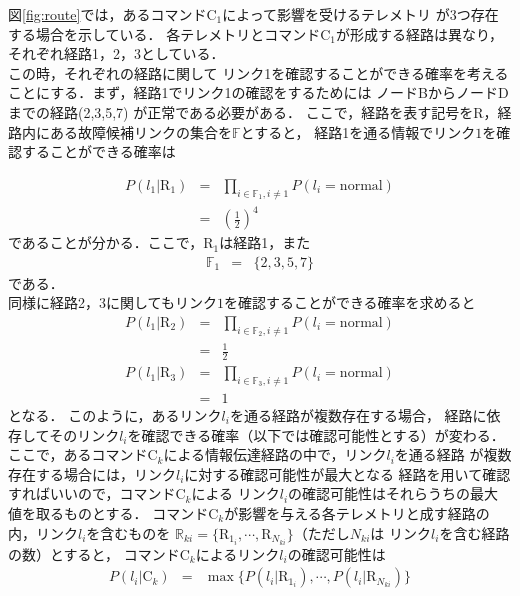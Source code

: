 \documentclass[11pt]{jsreport}
\begin{document}
図\ref{fig:route}では，あるコマンドC$_1$によって影響を受けるテレメトリ
が3つ存在する場合を示している．
各テレメトリとコマンドC$_1$が形成する経路は異なり，それぞれ経路1，2，3としている．\\
この時，それぞれの経路に関して
リンク1を確認することができる確率を考えることにする．まず，経路1でリンク1の確認をするためには
ノードBからノードDまでの経路(2,3,5,7)
が正常である必要がある．%
ここで，経路を表す記号をR，経路内にある故障候補リンクの集合を$\mathbb{F}$とすると，
経路1を通る情報でリンク$1$を確認することができる確率は

\begin{eqnarray}
   P(l_{1} | \text{R}_1) &=& \prod_{i\in\mathbb{F}_1,i\neq 1} P(l_{i} = \text{normal})\\
     &=& \left( \frac{1}{2}\right)^4
\end{eqnarray}
であることが分かる．ここで，R$_1$は経路1，また
\begin{eqnarray}
   \mathbb{F}_1  &=& \{ 2,3,5,7\} 
\end{eqnarray}
である．\\
同様に経路2，3に関してもリンク$1$を確認することができる確率を求めると
\begin{eqnarray}
   P(l_{1} | \text{R}_2)  &=& \prod_{i\in\mathbb{F}_2,i\neq 1} P(l_{i} = \text{normal})\\
   &=& \frac{1}{2}\\
   P(l_{1} | \text{R}_3)  &=& \prod_{i\in\mathbb{F}_3,i\neq 1} P(l_{i} = \text{normal})\\
   &=& 1
\end{eqnarray}
となる．
このように，あるリンク$l_i$を通る経路が複数存在する場合，
経路に依存してそのリンク$l_i$を確認できる確率（以下では確認可能性とする）が変わる．
ここで，あるコマンドC$_k$による情報伝達経路の中で，リンク$l_i$を通る経路
が複数存在する場合には，リンク$l_i$に対する確認可能性が最大となる
経路を用いて確認すればいいので，コマンドC$_k$による
リンク$l_i$の確認可能性はそれらうちの最大値を取るものとする．
コマンドC$_k$が影響を与える各テレメトリと成す経路の内，リンク$l_i$を含むものを
$\mathbb{R}_{ki} = \{ \text{R}_{1_i}, \cdots ,\text{R}_{N_{ki}} \}$（ただし$N_{ki}$は
リンク$l_i$を含む経路の数）とすると，
コマンドC$_k$によるリンク$l_i$の確認可能性は
\begin{eqnarray}
   P(l_i|\text{C}_k) &=& \max  \{ P(l_i|\text{R}_{1_i}), \cdots ,P(l_i|\text{R}_{N_{ki}}) \}
   \label{eq:P li Ck}
\end{eqnarray}
\end{document}
